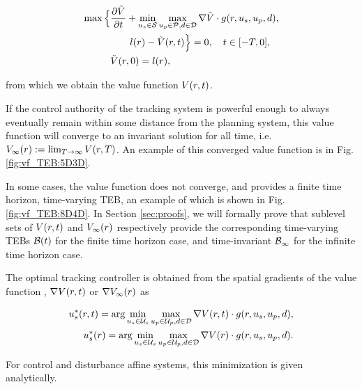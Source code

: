 \begin{align}
\max \Big\{&\frac{\partial \tilde\valfunc}{\partial \tvar} + \min_{\tctrl\in\tset} \max_{\pctrl\in\pset, \dstb\in\dset} \nabla \tilde\valfunc \cdot \rdyn(\rstate, \tctrl, \pctrl, \dstb), \nonumber \\
&\qquad\errfunc(\rstate) - \tilde\valfunc(\rstate, \tvar)\Big\} = 0, \quad \tvar \in [-T, 0], \label{eq:HJVI} \\
&\tilde\valfunc(\rstate, 0) = \errfunc(\rstate), \nonumber
\end{align}

\noindent from which we obtain the value function $V(r, t)$.


If the control authority of the tracking system is powerful enough to always eventually remain within some distance from the planning system, this value function will converge to an invariant solution for all time, i.e. $V_\infty(r) := \lim_{T\rightarrow\infty} V(r, T)$. 
An example of this converged value function is in Fig. \ref{fig:vf_TEB:5D3D}. 

In some cases, the value function does not converge, and provides a finite time horizon, time-varying TEB, an example of which is shown in Fig. \ref{fig:vf_TEB:8D4D}.
In Section \ref{sec:proofs}, we will formally prove that sublevel sets of $V(r,t)$ and $V_\infty(r)$ respectively provide the corresponding time-varying TEBs $\mathcal B(t)$ for the finite time horizon case, and time-invariant $\mathcal B_\infty$ for the infinite time horizon case.
 
The optimal tracking controller is obtained from the spatial gradients of the value function \cite{Mitchell05, Fisac15, Chen2018}, $\nabla V(r, t)$ or $\nabla V_\infty(r)$ as

\begin{subequations} \label{eq:opt_ctrl}
  \begin{align}
  u_s^*(r, t) = \arg\min_{u_s\in\mathcal{U}_s} \max_{u_p\in\mathcal{U}_p, d\in\mathcal{D}} \nabla V(r, t) \cdot g(r,u_s,u_p,d), \\
  u_s^*(r) = \arg\min_{u_s\in\mathcal{U}_s} \max_{u_p\in\mathcal{U}_p, d\in\mathcal{D}} \nabla V(r) \cdot g(r,u_s,u_p,d). 
  \end{align}
\end{subequations}

For control and disturbance affine systems, this minimization is given analytically.

